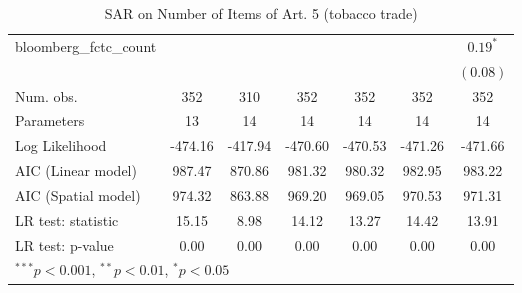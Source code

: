 \begin{table}[!h]
\begin{center}
\begin{tabular}{l c c c c c c }
bloomberg\_fctc\_count  &              &             &              &              &              & $0.19^{*}$   \\
                        &              &             &              &              &              & $(0.08)$     \\
\midrule
Num. obs.               & 352          & 310         & 352          & 352          & 352          & 352          \\
Parameters              & 13           & 14          & 14           & 14           & 14           & 14           \\
Log Likelihood          & -474.16      & -417.94     & -470.60      & -470.53      & -471.26      & -471.66      \\
AIC (Linear model)      & 987.47       & 870.86      & 981.32       & 980.32       & 982.95       & 983.22       \\
AIC (Spatial model)     & 974.32       & 863.88      & 969.20       & 969.05       & 970.53       & 971.31       \\
LR test: statistic      & 15.15        & 8.98        & 14.12        & 13.27        & 14.42        & 13.91        \\
LR test: p-value        & 0.00         & 0.00        & 0.00         & 0.00         & 0.00         & 0.00         \\
\bottomrule
\multicolumn{7}{l}{\scriptsize{$^{***}p<0.001$, $^{**}p<0.01$, $^*p<0.05$}}
\end{tabular}
\caption{SAR on Number of Items of Art. 5 (tobacco trade)}
\label{table:coefficients}
\end{center}
\end{table}
